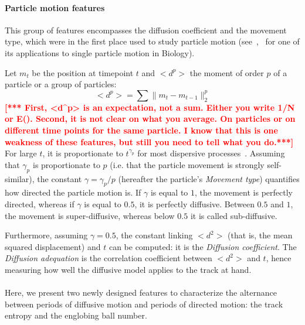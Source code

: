 \paragraph{Particle motion features\\} This group of features
encompasses the diffusion coefficient and the movement type, which
were in the first place used to study particle motion
(see~\cite{ferrari},~\cite{pmid16043363} for one of its applications to single particle motion in Biology).  

Let $m_t$ be the position at timepoint $t$ and $<d^p>$ the moment of
order $p$ of a particle or a group of particles: 
\[
<d^p>=\sum \|m_{t}-m_{t-1}\|_2^p
\]
\textcolor{red}{\bf [*** First, <d^p> is an expectation, not a
  sum. Either you write 1/N or E(). Second, it is not clear on what
  you average. On particles or on different time points for the same
  particle. I know that this is one weakness of these features, but
  still you need to tell what you do.***]} For large $t$, it is proportionate to $t^{\gamma_p}$ for
most dispersive processes~\cite{ferrari}. Assuming that $\gamma_p$ is
proportionate to $p$ (i.e. that the particle movement is strongly
self-similar), the constant $\gamma = \gamma_p /p$ (hereafter the particle's
\textit{Movement type}) quantifies how directed the particle motion is. If
$\gamma$ is equal to $1$, the movement is perfectly directed, whereas
if $\gamma$ is equal to $0.5$, it is perfectly diffusive. Between
$0.5$ and $1$, the movement is super-diffusive, whereas below $0.5$ it
is called sub-diffusive.  

Furthermore, assuming $ \gamma = 0.5 $, the constant linking $<d^2>$ (that is, the mean squared displacement) and $t$ can be computed: it is the \textit{Diffusion coefficient}. The \textit{Diffusion adequation} is the correlation coefficient between $<d^2>$ and $t$, hence measuring how well the diffusive model applies to the track at hand.
\paragraph*{}
Here, we present two newly designed features to characterize the
alternance between periods of diffusive motion and periods of directed
motion: the track entropy and the englobing ball number. 

